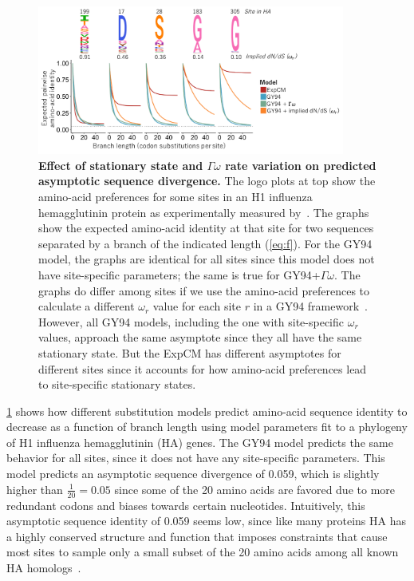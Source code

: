 \documentclass[11pt]{article}
\begin{document}
\begin{figure}
\centerline{\includegraphics[width=0.90\textwidth]{figures/decay.pdf}}
\caption{\label{fig:decay}
\textbf{Effect of stationary state and $\Gamma\omega$ rate variation on predicted asymptotic sequence divergence.}
The logo plots at top show the amino-acid preferences for some sites in an H1 influenza hemagglutinin protein as experimentally measured by~\citet{doud2016accurate}.
The graphs show the expected amino-acid identity at that site for two sequences separated by a branch of the indicated length (\ref{eq:f}).
For the GY94 model, the graphs are identical for all sites since this model does not have site-specific parameters; the same is true for GY94+$\Gamma\omega$.
The graphs do differ among sites if we use the amino-acid preferences to calculate a different $\omega_r$ value for each site $r$ in a GY94 framework~\citep[\ref{eq:w_r};][]{spielman2015relationship}.
However, all GY94 models, including the one with site-specific $\omega_r$ values, approach the same asymptote since they all have the same stationary state.
But the ExpCM has different asymptotes for different sites since it accounts for how amino-acid preferences lead to site-specific stationary states.
}
\end{figure}

\ref{fig:decay} shows how different substitution models predict amino-acid sequence identity to decrease as a function of branch length using model parameters fit to a phylogeny of H1 influenza hemagglutinin (HA) genes.
The GY94 model predicts the same behavior for all sites, since it does not have any site-specific parameters.
This model predicts an asymptotic sequence divergence of 0.059, which is slightly higher than $\frac{1}{20} = 0.05$ since some of the 20 amino acids are favored due to more redundant codons and biases towards certain nucleotides.
Intuitively, this asymptotic sequence identity of 0.059 seems low, since like many proteins HA has a highly conserved structure and function that imposes constraints that cause most sites to sample only a small subset of the 20 amino acids among all known HA homologs~\citep{nobusawa1991comparison}.
\end{document}
